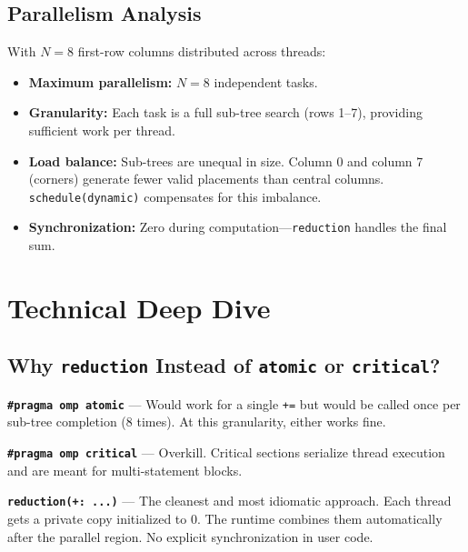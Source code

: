 \documentclass[11pt]{article}
\begin{document}
\subsection{Parallelism Analysis}

With $N = 8$ first-row columns distributed across threads:

\begin{itemize}
    \item \textbf{Maximum parallelism:} $N = 8$ independent tasks.
    \item \textbf{Granularity:} Each task is a full sub-tree search (rows 1--7), providing sufficient work per thread.
    \item \textbf{Load balance:} Sub-trees are unequal in size. Column 0 and column 7 (corners) generate fewer valid placements than central columns. \texttt{schedule(dynamic)} compensates for this imbalance.
    \item \textbf{Synchronization:} Zero during computation---\texttt{reduction} handles the final sum.
\end{itemize}

\section{Technical Deep Dive}

\subsection{Why \texttt{reduction} Instead of \texttt{atomic} or \texttt{critical}?}

\begin{shadedbox}
\textbf{\texttt{\#pragma omp atomic}} --- Would work for a single \texttt{+=} but would be called once per sub-tree completion (8 times). At this granularity, either works fine.

\vspace{4pt}
\textbf{\texttt{\#pragma omp critical}} --- Overkill. Critical sections serialize thread execution and are meant for multi-statement blocks.

\vspace{4pt}
\textbf{\texttt{reduction(+: ...)}} --- The cleanest and most idiomatic approach. Each thread gets a private copy initialized to 0. The runtime combines them automatically after the parallel region. No explicit synchronization in user code.
\end{shadedbox}
\end{document}
